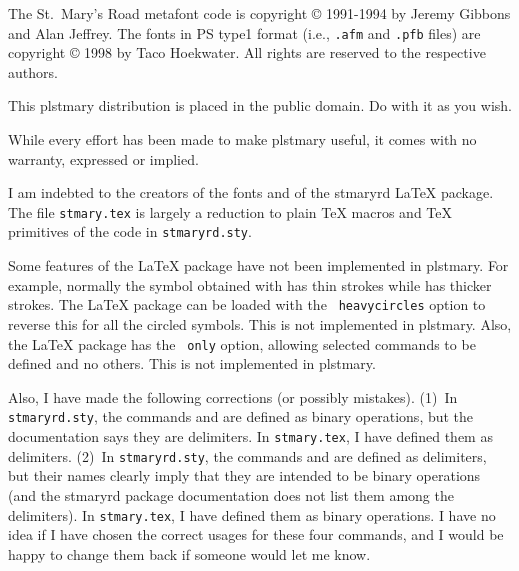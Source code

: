 \bigskip
{}

\medskip
\noindent The St.\ Mary's Road metafont code is copyright \copyright
1991-1994 by Jeremy Gibbons and Alan Jeffrey. The fonts in PS type1
format (i.e., {\tt .afm} and {\tt .pfb} files) are copyright \copyright
1998 by Taco Hoekwater. All rights are reserved to the respective
authors.

This plstmary distribution is placed in the public domain. Do with it as
you wish.

While every effort has been made to make plstmary useful, it comes with
no warranty, expressed or implied.

\bigskip
{}
I am indebted to the creators of the fonts and of the stmaryrd
LaTeX package. The file {\tt stmary.tex} is largely a reduction to plain
TeX macros and TeX primitives of the code in {\tt stmaryrd.sty}.

\bigskip
{}

\medskip
\noindent Some features of the LaTeX package have not been implemented
in plstmary. For example, normally the symbol obtained with
{\cmd\oplus} has thin strokes while {\cmd\varoplus} has
thicker strokes. The LaTeX package can be loaded with the {\tt
heavycircles} option to reverse this for all the circled symbols. This
is not implemented in plstmary. Also, the LaTeX package has the {\tt
only} option, allowing selected commands to be defined and no others.
This is not implemented in plstmary.

Also, I have made the following corrections (or possibly mistakes).
(1)~In {\tt stmaryrd.sty}, the commands {\cmd\lbag} and
{\cmd\rbag} are defined as binary operations, but the
documentation says they are delimiters. In {\tt stmary.tex}, I have
defined them as delimiters. (2)~In {\tt stmaryrd.sty}, the commands
{\cmd\binampersand} and {\cmd\bindnasrepma} are defined as
delimiters, but their names clearly imply that they are intended to be
binary operations (and the stmaryrd package documentation does not list
them among the delimiters). In {\tt stmary.tex}, I have defined them as
binary operations. I have no idea if I have chosen the correct usages
for these four commands, and I would be happy to change them back if
someone would let me know.

